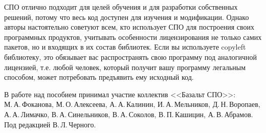 СПО отлично подходит для целей обучения и для разработки собственных решений, потому что весь 
код доступен для изучения и модификации. Однако авторы настоятельно советуют всем, кто использует
СПО для построения своих программных продуктов, учитывать особенности лицензирования не только самих 
пакетов, но и входящих в их состав библиотек. Если вы используете copyleft библиотеку, 
это обязывает вас распространять свою программу под аналогичной лицензией,  т.е. любой человек, который
получит вашу программу легальным способом, может потребовать предъявить ему исходный код.

В работе над пособием принимал участие коллектив <<Базальт СПО>>:\\
М.\,А.\,Фоканова, М.\,О.\,Алексеева, А.\,А.\,Калинин, И.\,А.\,Мельников, Д.\,Н.\,Воропаев, А.\,А.\,Лимачко, В.\,А.\,Синельников, В.\,А.\,Соколов, В.\,П.\,Кашицин, А.\,В.\,Абрамов. Под редакцией В.\,Л.\,Черного. 

